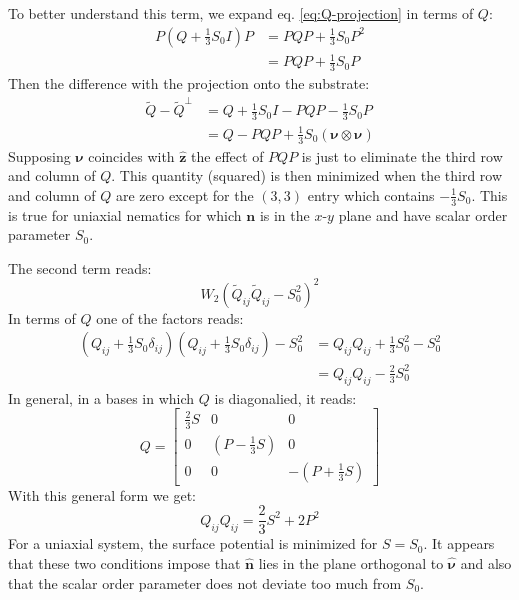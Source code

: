 \documentclass[reqno]{article}
\begin{document}
To better understand this term, we expand eq. \eqref{eq:Q-projection} in terms of $Q$:
\begin{equation}
\begin{split}
    P \left( Q + \frac13 S_0 I \right) P
    &=
    P Q P + \frac13 S_0 P^2 \\
    &= P Q P + \frac13 S_0 P
\end{split}
\end{equation}
Then the difference with the projection onto the substrate:
\begin{equation}
\begin{split}
    \tilde{Q} - \tilde{Q}^\perp
    &=
    Q + \frac13 S_0 I
    - PQP - \frac13 S_0 P \\
    &= Q - PQP + \frac13 S_0 \left( \boldsymbol{\nu} \otimes \boldsymbol{\nu} \right)
\end{split}
\end{equation}
Supposing $\boldsymbol{\nu}$ coincides with $\hat{\mathbf{z}}$ the effect of $PQP$ is just to eliminate the third row and column of $Q$.
This quantity (squared) is then minimized when the third row and column of $Q$ are zero except for the $(3, 3)$ entry which contains $-\frac13 S_0$.
This is true for uniaxial nematics for which $\mathbf{n}$ is in the $x$-$y$ plane and have scalar order parameter $S_0$. 

The second term reads:
\begin{equation}
    W_2 \left(\tilde{Q}_{ij} \tilde{Q}_{ij} - S_0^2 \right)^2
\end{equation}
In terms of $Q$ one of the factors reads:
\begin{equation}
\begin{split}
    \left(Q_{ij} + \frac13 S_0 \delta_{ij}\right)\left(Q_{ij} + \frac13 S_0 \delta_{ij}\right)
    - S_0^2
    &=
    Q_{ij} Q_{ij} + \frac13 S_0^2 - S_0^2 \\
    &=
    Q_{ij} Q_{ij} - \tfrac23 S_0^2
\end{split}
\end{equation}
In general, in a bases in which $Q$ is diagonalied, it reads:
\begin{equation}
    Q
    =
    \begin{bmatrix}
    \frac23 S &0 &0 \\
    0 &\left(P - \frac13 S\right) &0 \\
    0 &0 &-\left(P + \frac13 S\right)
    \end{bmatrix}
\end{equation}
With this general form we get:
\begin{equation}
    Q_{ij} Q_{ij}
    =
    \frac23 S^2 + 2 P^2 
\end{equation}
For a uniaxial system, the surface potential is minimized for $S = S_0$.
It appears that these two conditions impose that $\mathbf{\hat{n}}$ lies in the plane orthogonal to $\boldsymbol{\hat{\nu}}$ and also that the scalar order parameter does not deviate too much from $S_0$.
\end{document}
